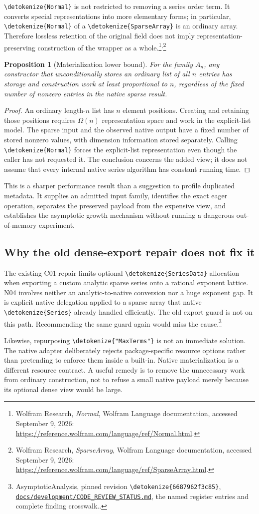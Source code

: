 \documentclass[11pt]{article}
\newcommand{\code}[1]{{\ttfamily\expandafter\nolinkurl\expandafter{\detokenize{#1}}}}
\newcommand{\repo}{https://github.com/VladimirReshetnikov/Asymptotic/blob/6687962f3c858a4f93623cfc496f33e35c6763d4/}
\newcommand{\src}[2]{\footnote{AsymptoticAnalysis, pinned revision \code{6687962f3c85}, \href{\repo#1}{\nolinkurl{#1}}, #2.}}
\newcommand{\wdoc}[1]{\footnote{Wolfram Research, \emph{#1}, Wolfram Language documentation, accessed September 9, 2026: \url{https://reference.wolfram.com/language/ref/#1.html}.}}
\newcommand{\register}{\src{docs/development/CODE_REVIEW_STATUS.md}{the named register entries and complete finding crosswalk.}}
\newtheorem{proposition}{Proposition}[section]
\begin{document}
\code{Normal} is not restricted to removing a series order term. It converts special representations into more elementary forms; in particular, \code{Normal} of a \code{SparseArray} is an ordinary array. Therefore lossless retention of the original field does not imply representation-preserving construction of the wrapper as a whole.\wdoc{Normal}\textsuperscript{,}\wdoc{SparseArray}

\begin{proposition}[Materialization lower bound]
For the family $A_n$, any constructor that unconditionally stores an ordinary list of all $n$ entries has storage and construction work at least proportional to $n$, regardless of the fixed number of nonzero entries in the native sparse result.
\end{proposition}
\begin{proof}
An ordinary length-$n$ list has $n$ element positions. Creating and retaining those positions requires $\Omega(n)$ representation space and work in the explicit-list model. The sparse input and the observed native output have a fixed number of stored nonzero values, with dimension information stored separately. Calling \code{Normal} forces the explicit-list representation even though the caller has not requested it. The conclusion concerns the added view; it does not assume that every internal native series algorithm has constant running time.
\end{proof}

This is a sharper performance result than a suggestion to profile duplicated metadata. It supplies an admitted input family, identifies the exact eager operation, separates the preserved payload from the expensive view, and establishes the asymptotic growth mechanism without running a dangerous out-of-memory experiment.

\subsection{Why the old dense-export repair does not fix it}
The existing C01 repair limits optional \code{SeriesData} allocation when exporting a custom analytic sparse series onto a rational exponent lattice. N04 involves neither an analytic-to-native conversion nor a huge exponent gap. It is explicit native delegation applied to a sparse array that native \code{Series} already handled efficiently. The old export guard is not on this path. Recommending the same guard again would miss the cause.\register

Likewise, repurposing \code{"MaxTerms"} is not an immediate solution. The native adapter deliberately rejects package-specific resource options rather than pretending to enforce them inside a built-in. Native materialization is a different resource contract. A useful remedy is to remove the unnecessary work from ordinary construction, not to refuse a small native payload merely because its optional dense view would be large.
\end{document}

